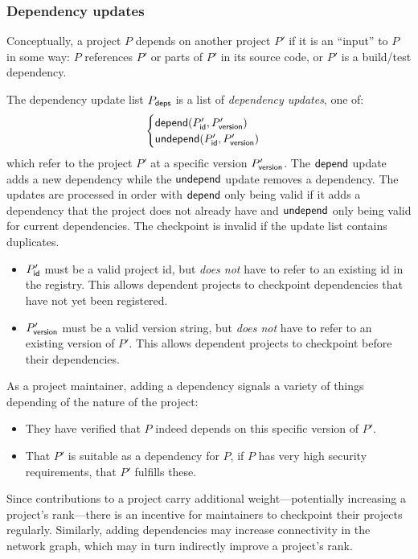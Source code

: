 \subsubsection{Dependency updates}
\label{s:checkpoint-deps}
Conceptually, a project $P$ depends on another project $P'$ if it is an
``input'' to $P$ in some way: $P$ references $P'$ or parts of $P'$ in its
source code, or $P'$ is a build/test dependency.

The dependency update list $P_{\mathsf{deps}}$ is a list of \emph{dependency
  updates}, one of:
\[
    \begin{cases}
        \mathsf{depend}(P'_{\mathsf{id}}, P'_{\mathsf{version}}) \\
        \mathsf{undepend}(P'_{\mathsf{id}}, P'_{\mathsf{version}})
    \end{cases}
\]
which refer to the project $P'$ at a specific version $P'_{\mathsf{version}}$.
The $\mathsf{depend}$ update adds a new dependency while the $\mathsf{undepend}$ update removes
a dependency. The updates are processed in order with $\mathsf{depend}$ only being
valid if it adds a dependency that the project does not already have and
$\mathsf{undepend}$ only being valid for current dependencies. The checkpoint is
invalid if the update list contains duplicates.


\bigskip
\validation
\begin{itemize}
    \item $P'_{\mathsf{id}}$ must be a valid project id, but \emph{does not}
        have to refer to an existing id in the registry. This allows dependent
        projects to checkpoint dependencies that have not yet been registered.
    \item $P'_{\mathsf{version}}$ must be a valid version string, but \emph{does not}
        have to refer to an existing version of $P'$. This allows dependent projects
        to checkpoint before their dependencies.
\end{itemize}
As a project maintainer, adding a dependency signals a variety of things
depending of the nature of the project:
\begin{itemize}
\item They have verified that $P$ indeed depends on this specific
  version of $P'$.
\item That $P'$ is suitable as a dependency for $P$, \eg{} if $P$ has
  very high security requirements, that $P'$ fulfills these.
\end{itemize}
\noindent Since contributions to a project carry additional
weight---potentially increasing a project's rank---there is an incentive
for maintainers to checkpoint their projects regularly.  Similarly, adding
dependencies may increase connectivity in the network graph, which may in turn
indirectly improve a project's rank.


